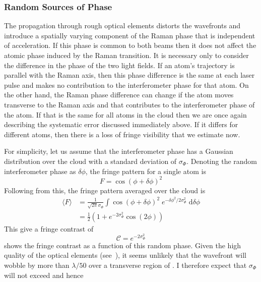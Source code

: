 \subsubsection{Random Sources of Phase}
The propagation through rough optical elements distorts
the wavefronts and introduce a spatially varying component of the
Raman phase that is independent
of acceleration. If this phase is common to both beams then it does
not affect the atomic phase induced by the Raman
transition. It is necessary only to consider the difference in the phase of
the two light fields. If an atom's trajectory is parallel with the Raman axis,
then this phase difference is the same at each laser pulse and makes
no contribution to the interferometer phase for that atom. On the other hand, 
the Raman phase difference can change if the atom moves transverse to
the Raman axis and that contributes to the interferometer phase of the
atom. If that is the same for all atoms in the cloud then we are once
again describing the systematic error discussed immediately above. If
it differs for different atoms, then there is a loss of fringe
visibility that we estimate now.
\par\noindent 
For simplicity, let us assume that the interferometer phase has a
Gaussian distribution over the cloud with a standard deviation of \(\sigma_\Phi 
\). Denoting the random interferometer phase as \(\delta\phi\), the
fringe pattern for a single atom is
\begin{equation}
	F = \cos\left(\phi + \delta\phi\right)^2
\end{equation}
Following from this, the fringe pattern averaged over the cloud is
\begin{align}
  \langle F \rangle & = \frac{1}{\sqrt{2\pi}\sigma_\Phi}\int
  \cos(\phi+\delta \phi)^2 \; e^{-\delta\phi^2/2\sigma_\Phi^2} \; \mathrm{d}\delta\phi \\
                    &= \frac{1}{2}(1+e^{-2\sigma_{\Phi}^2}\cos(2\phi)) 
\end{align}
This give a fringe contrast of
\begin{equation}
    \mathcal{C} = e^{-2 \sigma_\Phi^2}
\end{equation}
 shows the fringe contrast as a
function of this random phase. Given the high quality of the optical
elements (see~), it seems unlikely
that the wavefront will wobble by more than $\lambda/50$ over a
transverse region of . I therefore expect that
$\sigma_\Phi$ will not exceed  and hence
